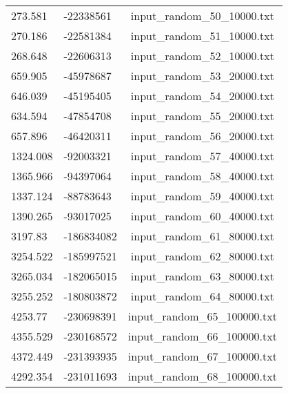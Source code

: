 \begin{longtable}[hb]{|l|l|c|}
    273.581 & -22338561 & input\_random\_50\_10000.txt \\
    270.186 & -22581384 & input\_random\_51\_10000.txt \\
    268.648 & -22606313 & input\_random\_52\_10000.txt \\
    659.905 & -45978687 & input\_random\_53\_20000.txt \\
    646.039 & -45195405 & input\_random\_54\_20000.txt \\
    634.594 & -47854708 & input\_random\_55\_20000.txt \\
    657.896 & -46420311 & input\_random\_56\_20000.txt \\
    1324.008 & -92003321 & input\_random\_57\_40000.txt \\
    1365.966 & -94397064 & input\_random\_58\_40000.txt \\
    1337.124 & -88783643 & input\_random\_59\_40000.txt \\
    1390.265 & -93017025 & input\_random\_60\_40000.txt \\
    3197.83 & -186834082 & input\_random\_61\_80000.txt \\
    3254.522 & -185997521 & input\_random\_62\_80000.txt \\
    3265.034 & -182065015 & input\_random\_63\_80000.txt \\
    3255.252 & -180803872 & input\_random\_64\_80000.txt \\
    4253.77 & -230698391 & input\_random\_65\_100000.txt \\
    4355.529 & -230168572 & input\_random\_66\_100000.txt \\
    4372.449 & -231393935 & input\_random\_67\_100000.txt \\
    4292.354 & -231011693 & input\_random\_68\_100000.txt \\
    \hline
\end{longtable}